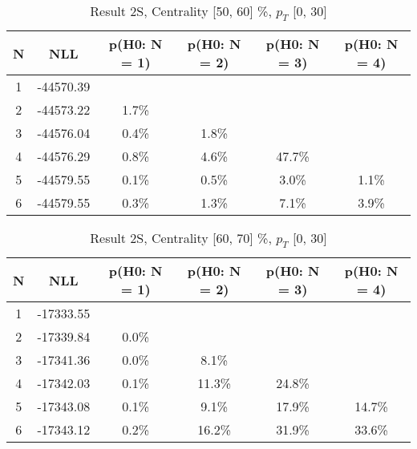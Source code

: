 \begin{table}[htb]
	\begin{center}
	\caption{Result 2S, Centrality [50, 60] \%, $p_{T}$ [0, 30] \GeV
}
{\footnotesize\renewcommand{\arraystretch}{1.4}
		\begin{tabular}{cc||cccc}
			N & NLL & p(H0: N = 1) & p(H0: N = 2) & p(H0: N = 3) & p(H0: N = 4)\\ 
		\hline
1 & -44570.39 & & & &\\
2 & -44573.22 & 1.7\% & & &\\
3 & -44576.04 & 0.4\% & 1.8\% & &\\
4 & -44576.29 & 0.8\% & 4.6\% & 47.7\% &\\
5 & -44579.55 & 0.1\% & 0.5\% & 3.0\% & 1.1\%\\
6 & -44579.55 & 0.3\% & 1.3\% & 7.1\% & 3.9\% \\
	\end{tabular}
		\label{tab:lab}
	}
	\end{center}\end{table}

\begin{table}[htb]
	\begin{center}
	\caption{Result 2S, Centrality [60, 70] \%, $p_{T}$ [0, 30] \GeV
}
{\footnotesize\renewcommand{\arraystretch}{1.4}
		\begin{tabular}{cc||c>{\columncolor[gray]{0.8}}ccc}
			N & NLL & p(H0: N = 1) & p(H0: N = 2) & p(H0: N = 3) & p(H0: N = 4)\\ 
		\hline
1 & -17333.55 & & & &\\
2 & -17339.84 & 0.0\% & & &\\
3 & -17341.36 & 0.0\% & 8.1\% & &\\
4 & -17342.03 & 0.1\% & 11.3\% & 24.8\% &\\
5 & -17343.08 & 0.1\% & 9.1\% & 17.9\% & 14.7\%\\
6 & -17343.12 & 0.2\% & 16.2\% & 31.9\% & 33.6\% \\
	\end{tabular}
		\label{tab:lab}
	}
	\end{center}\end{table}

